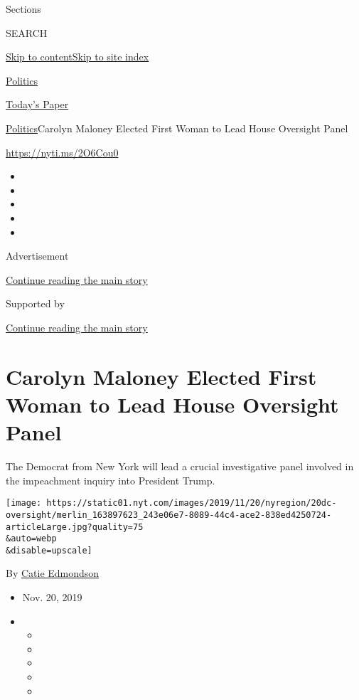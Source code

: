Sections

SEARCH

\protect\hyperlink{site-content}{Skip to
content}\protect\hyperlink{site-index}{Skip to site index}

\href{https://www.nytimes.com/section/politics}{Politics}

\href{https://myaccount.nytimes.com/auth/login?response_type=cookie\&client_id=vi}{}

\href{https://www.nytimes.com/section/todayspaper}{Today's Paper}

\href{/section/politics}{Politics}\textbar{}Carolyn Maloney Elected
First Woman to Lead House Oversight Panel

\url{https://nyti.ms/2O6Cou0}

\begin{itemize}
\item
\item
\item
\item
\item
\end{itemize}

Advertisement

\protect\hyperlink{after-top}{Continue reading the main story}

Supported by

\protect\hyperlink{after-sponsor}{Continue reading the main story}

\hypertarget{carolyn-maloney-elected-first-woman-to-lead-house-oversight-panel}{%
\section{Carolyn Maloney Elected First Woman to Lead House Oversight
Panel}\label{carolyn-maloney-elected-first-woman-to-lead-house-oversight-panel}}

The Democrat from New York will lead a crucial investigative panel
involved in the impeachment inquiry into President Trump.

\texttt{[image: https://static01.nyt.com/images/2019/11/20/nyregion/20dc-oversight/merlin\_163897623\_243e06e7-8089-44c4-ace2-838ed4250724-articleLarge.jpg?quality=75\\\&auto=webp\\\&disable=upscale]}

By \href{https://www.nytimes.com/by/catie-edmondson}{Catie Edmondson}

\begin{itemize}
\item
  Nov. 20, 2019
\item
  \begin{itemize}
  \item
  \item
  \item
  \item
  \item
  \end{itemize}
\end{itemize}

